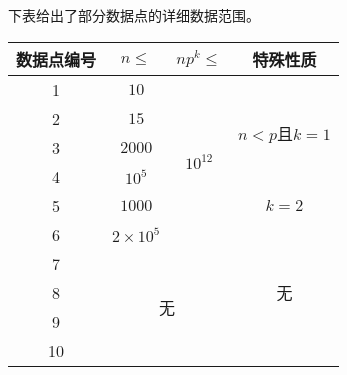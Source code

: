 \documentclass{article}
\begin{document}
下表给出了部分数据点的详细数据范围。
\begin{center}
    \begin{tabular}{|c|c|c|c|} \hline
        数据点编号 & $n \leq$ & $np^k \leq$ & 特殊性质 \\ \hline
        1 & $10$ & \multirow{6}{*}{$10^{12}$} & \multirow{4}{*}{$n<p$且$k=1$} \\ \cline{1-2}
        2 & $15$ & & \\ \cline{1-2}
        3 & $2000$ & & \\ \cline{1-2}
        4 & $10^5$ & & \\ \cline{1-2} \cline{4-4}
        5 & $1000$ & & $k=2$ \\ \cline{1-2} \cline{4-4}
        6 & $2 \times 10^5$ & & \multirow{5}{*}{无} \\ \cline{1-3}
        7 & \multicolumn{2}{|c|}{\multirow{4}{*}{无}} & \\ \cline{1-1}
        8 & \multicolumn{2}{|c|}{} & \\ \cline{1-1}
        9 & \multicolumn{2}{|c|}{} & \\ \cline{1-1}
        10 & \multicolumn{2}{|c|}{} & \\ \hline
    \end{tabular}
\end{center}
\end{document}
